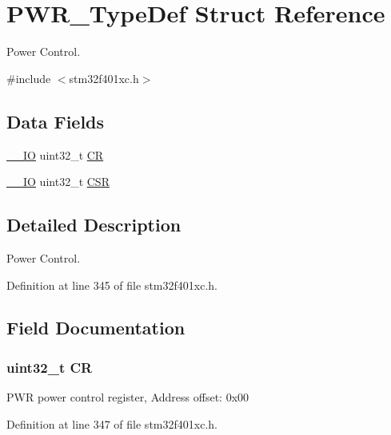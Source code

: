 \hypertarget{struct_p_w_r___type_def}{}\section{P\+W\+R\+\_\+\+Type\+Def Struct Reference}
\label{struct_p_w_r___type_def}


Power Control.  




{\ttfamily \#include $<$stm32f401xc.\+h$>$}

\subsection*{Data Fields}
\begin{DoxyCompactItemize}
\item 
\hyperlink{core__sc300_8h_aec43007d9998a0a0e01faede4133d6be}{\+\_\+\+\_\+\+IO} uint32\+\_\+t \hyperlink{struct_p_w_r___type_def_ab40c89c59391aaa9d9a8ec011dd0907a}{CR}
\item 
\hyperlink{core__sc300_8h_aec43007d9998a0a0e01faede4133d6be}{\+\_\+\+\_\+\+IO} uint32\+\_\+t \hyperlink{struct_p_w_r___type_def_a876dd0a8546697065f406b7543e27af2}{C\+SR}
\end{DoxyCompactItemize}


\subsection{Detailed Description}
Power Control. 

Definition at line 345 of file stm32f401xc.\+h.



\subsection{Field Documentation}
\subsubsection[{\texorpdfstring{CR}{CR}}]{ uint32\+\_\+t CR}\hypertarget{struct_p_w_r___type_def_ab40c89c59391aaa9d9a8ec011dd0907a}{}\label{struct_p_w_r___type_def_ab40c89c59391aaa9d9a8ec011dd0907a}
P\+WR power control register, Address offset\+: 0x00 

Definition at line 347 of file stm32f401xc.\+h.

